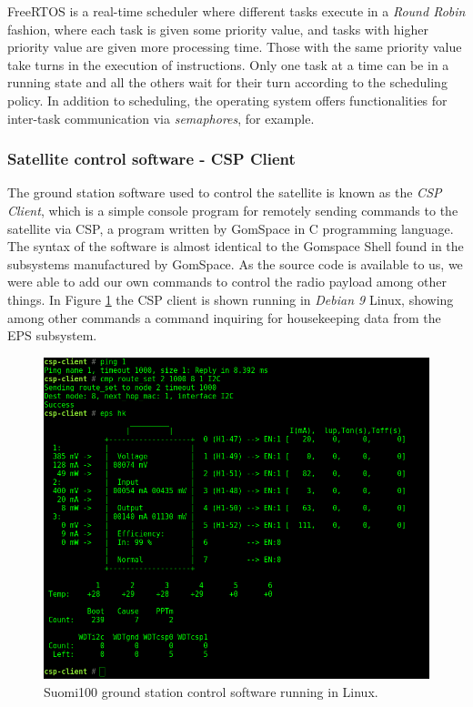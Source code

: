 \documentclass[english,12pt,a4paper,pdftex,elec,utf8]{aaltothesis}
\begin{document}
FreeRTOS is a real-time scheduler where different tasks execute in a \textit{Round Robin} fashion, where each task is given some priority value, and tasks with higher priority value are given more processing time. Those with the same priority value take turns in the execution of instructions. Only one task at a time can be in a running state and all the others wait for their turn according to the scheduling policy. In addition to scheduling, the operating system offers functionalities for inter-task communication via \textit{semaphores}, for example. \cite{freertosref}\par 

\subsubsection{Satellite control software - CSP Client}
The ground station software used to control the satellite is known as the \textit{CSP Client}, which is a simple console program for remotely sending commands to the satellite via CSP, a program written by GomSpace in C programming language. The syntax of the software is almost identical to the Gomspace Shell found in the subsystems manufactured by GomSpace. As the source code is available to us, we were able to add our own commands to control the radio payload among other things. In Figure \ref{cspclient} the CSP client is shown running in \textit{Debian 9} Linux, showing among other commands a command inquiring for housekeeping data from the EPS subsystem.\par 
\begin{figure}[h!]
\centering
\includegraphics[scale=0.3]{cspclient1}
\caption{Suomi100 ground station control software running in Linux.}
\label{cspclient}
\end{figure}
\end{document}
